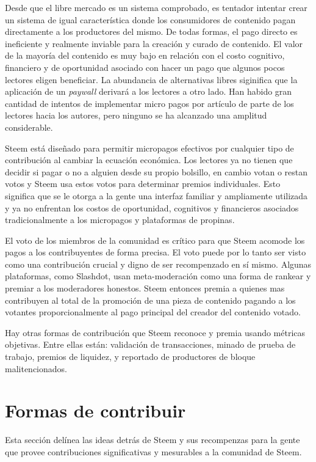 \documentclass[a4paper,titlepage,final]{article}
\begin{document}
Desde que el libre mercado es un sistema comprobado, es tentador intentar crear un sistema de igual característica donde los consumidores de contenido pagan directamente a los productores del mismo. De todas formas, el pago directo es ineficiente y realmente inviable para la creación y curado de contenido. El valor de la mayoría del contenido es muy bajo en relación con el costo cognitivo, financiero y de oportunidad asociado con hacer un pago que algunos pocos lectores eligen beneficiar. La abundancia de alternativas libres siginifica que la aplicación de un \textit{paywall} derivará a los lectores a otro lado. Han habido gran cantidad de intentos de implementar micro pagos por artículo de parte de los lectores hacia los autores, pero ninguno se ha alcanzado una amplitud considerable.

Steem está diseñado para permitir micropagos efectivos por cualquier tipo de contribución al cambiar la ecuación económica. Los lectores ya no tienen que decidir si pagar o no a alguien desde su propio bolsillo, en cambio votan o restan votos y Steem usa estos votos para determinar premios individuales. Esto significa que se le otorga a la gente una interfaz familiar y ampliamente utilizada y ya no enfrentan los costos de oportunidad, cognitivos y financieros asociados tradicionalmente a los micropagos y plataformas de propinas.

El voto de los miembros de la comunidad es crítico para que Steem acomode los pagos a los contribuyentes de forma precisa. El voto puede por lo tanto ser visto como una contribución crucial y digno de ser recompenzado en sí mismo. Algunas plataformas, como Slashdot, usan meta-moderación\cite{3} como una forma de rankear y premiar a los moderadores honestos. Steem entonces premia a quienes mas contribuyen al total de la promoción de una pieza de contenido pagando a los votantes proporcionalmente al pago principal del creador del contenido votado.

Hay otras formas de contribución que Steem reconoce y premia usando métricas objetivas. Entre ellas están: validación de transacciones, minado de prueba de trabajo, premios de liquidez, y reportado de productores de bloque malitencionados.

\section{Formas de contribuir}

Esta sección delínea las ideas detrás de Steem y sus recompenzas para la gente que provee contribuciones significativas y mesurables a la comunidad de Steem.
\end{document}
